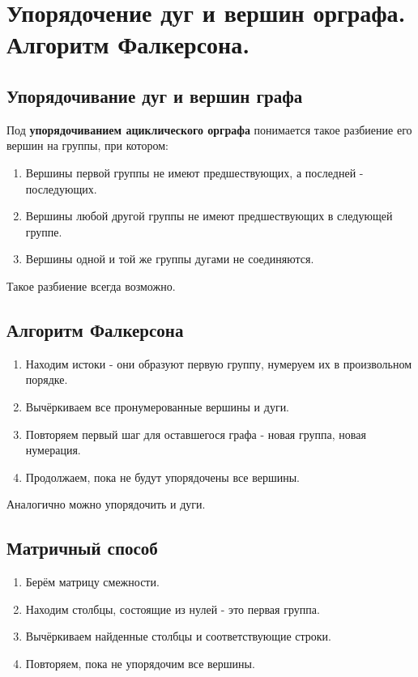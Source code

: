 {
	\section{Упорядочение дуг и вершин орграфа. Алгоритм Фалкерсона.}

	\subsection*{Упорядочивание дуг и вершин графа}

Под \textbf{упорядочиванием ациклического орграфа} понимается такое разбиение его вершин на группы, при котором:
\begin{enumerate}
  \item Вершины первой группы не имеют предшествующих, а последней - последующих.
  \item Вершины любой другой группы не имеют предшествующих в следующей группе.
  \item Вершины одной и той же группы дугами не соединяются.
\end{enumerate}

Такое разбиение всегда возможно.

\subsection*{Алгоритм Фалкерсона}

\begin{enumerate}
  \item Находим истоки - они образуют первую группу, нумеруем их в произвольном порядке.
  \item Вычёркиваем все пронумерованные вершины и дуги.
  \item Повторяем первый шаг для оставшегося графа - новая группа, новая нумерация.
  \item Продолжаем, пока не будут упорядочены все вершины.
\end{enumerate}

Аналогично можно упорядочить и дуги.

\subsection*{Матричный способ}

\begin{enumerate}
  \item Берём матрицу смежности.
  \item Находим столбцы, состоящие из нулей - это первая группа.
  \item Вычёркиваем найденные столбцы и соответствующие строки.
  \item Повторяем, пока не упорядочим все вершины.
\end{enumerate}


    \newpage
}
